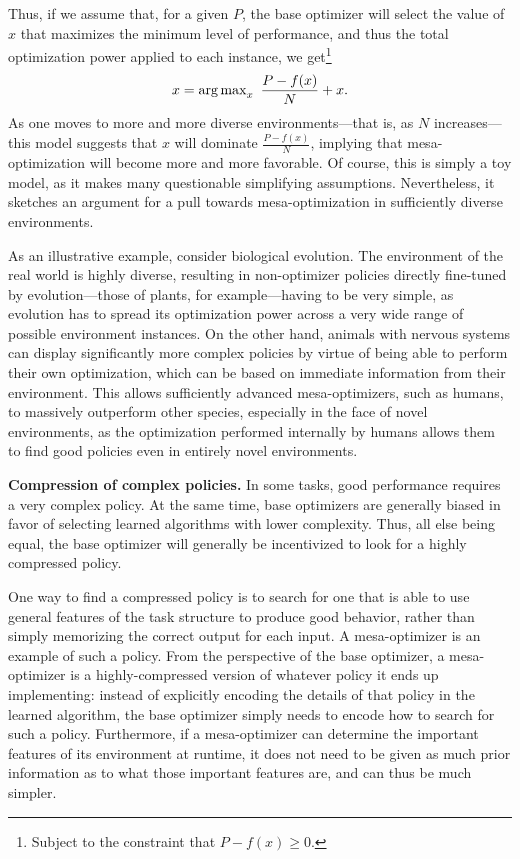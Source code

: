 \documentclass[
  onecolumn,
  natbib,
]{miri-tech-article}
\begin{document}
Thus, if we assume that, for a given $P$, the base optimizer will select the value of $x$ that maximizes the minimum level of performance, and thus the total optimization power applied to each instance, we get\footnote{Subject to the constraint that $P - f(x) \ge 0$.}
\[
  x = \operatorname{arg\,max}_x~ \frac{P - f(x)}{N} + x.
\]
As one moves to more and more diverse environments---that is, as $N$ increases---this model suggests that $x$ will dominate $\frac{P - f(x)}{N}$, implying that mesa-optimization will become more and more favorable. Of course, this is simply a toy model, as it makes many questionable simplifying assumptions. Nevertheless, it sketches an argument for a pull towards mesa-optimization in sufficiently diverse environments.

As an illustrative example, consider biological evolution. The environment of the real world is highly diverse, resulting in non-optimizer policies directly fine-tuned by evolution---those of plants, for example---having to be very simple, as evolution has to spread its optimization power across a very wide range of possible environment instances. On the other hand, animals with nervous systems can display significantly more complex policies by virtue of being able to perform their own optimization, which can be based on immediate information from their environment. This allows sufficiently advanced mesa-optimizers, such as humans, to massively outperform other species, especially in the face of novel environments, as the optimization performed internally by humans allows them to find good policies even in entirely novel environments.

\textbf{Compression of complex policies.} In some tasks, good performance requires a very complex policy. At the same time, base optimizers are generally biased in favor of selecting learned algorithms with lower complexity. Thus, all else being equal, the base optimizer will generally be incentivized to look for a highly compressed policy.

One way to find a compressed policy is to search for one that is able to use general features of the task structure to produce good behavior, rather than simply memorizing the correct output for each input. A mesa-optimizer is an example of such a policy. From the perspective of the base optimizer, a mesa-optimizer is a highly-compressed version of whatever policy it ends up implementing: instead of explicitly encoding the details of that policy in the learned algorithm, the base optimizer simply needs to encode how to search for such a policy. Furthermore, if a mesa-optimizer can determine the important features of its environment at runtime, it does not need to be given as much prior information as to what those important features are, and can thus be much simpler.
\end{document}

